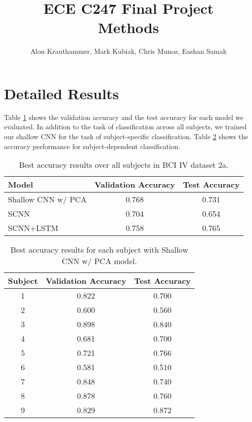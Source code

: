 \documentclass{article}
\author{Alon Krauthammer, Mark Kubiak, Chris Munoz, Eashan Samak}
\title{\vspace{-2cm}ECE C247 Final Project\\
Methods}
\begin{document}
\maketitle

\section{Detailed Results}
Table \ref{tab:acc} shows the validation accuracy and the test accuracy for each
model we evaluated. In addition to the task of classification across all
subjects, we trained our shallow CNN for the task of subject-specific
classification. Table \ref{tab:subj} shows the accuracy performance for
subject-dependent classification.

\begin{table}[H]
\small
\begin{center}
    \begin{tabular}{|l|c|c|}
        \hline
        Model           & Validation Accuracy & Test Accuracy   \\
        \hline\hline
        Shallow CNN w/ PCA  & 0.768               & 0.731           \\
        SCNN                & 0.704               & 0.654           \\
        SCNN+LSTM           & 0.758               & 0.765           \\
        \hline
    \end{tabular}
\end{center}
\caption{Best accuracy results over all subjects in BCI IV dataset 2a.}
\label{tab:acc}
\end{table}

\begin{table}[H]
\small
\begin{center}
    \begin{tabular}{|c|c|c|}
        \hline
        Subject & Validation Accuracy   & Test Accuracy \\
        \hline\hline
        1       & 0.822  & 0.700    \\
        2       & 0.600  & 0.560    \\
        3       & 0.898  & 0.840    \\
        4       & 0.681  & 0.700    \\
        5       & 0.721  & 0.766    \\
        6       & 0.581  & 0.510    \\
        7       & 0.848  & 0.740    \\
        8       & 0.878  & 0.760    \\
        9       & 0.829  & 0.872    \\
        \hline
    \end{tabular}
\end{center}
\caption{Best accuracy results for each subject with Shallow CNN w/ PCA model.}
\label{tab:subj}
\end{table}
\end{document}
